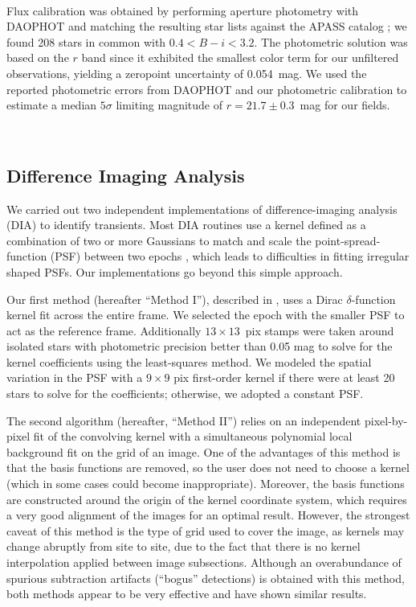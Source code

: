\documentclass[apjl]{emulateapj}
\begin{document}
\ \par

Flux calibration was obtained by performing aperture photometry with DAOPHOT \citep{Stetson1987} and matching the resulting star lists against the APASS catalog \citep{Henden2016}; we found 208 stars in common with $0.4 < B-i < 3.2$. The photometric solution was based on the $r$ band since it exhibited the smallest color term for our unfiltered observations, yielding a zeropoint uncertainty of 0.054~mag. We used the reported photometric errors from DAOPHOT and our photometric calibration to estimate a median $5\sigma$ limiting magnitude of $r=21.7\pm0.3$~mag for our fields.

\ \par

\subsection{Difference Imaging  Analysis} \label{2kk}
We carried out two independent implementations of difference-imaging analysis (DIA) to identify transients. Most DIA routines use a kernel defined as a combination of two or more Gaussians to match and scale the point-spread-function (PSF) between two epochs \citep{Alard1998}, which leads to difficulties in fitting irregular shaped PSFs. Our implementations go beyond this simple approach.

Our first method (hereafter ``Method I''), described in \citet{Oelkers2015}, uses a Dirac $\delta$-function kernel fit across the entire frame. We selected the epoch with the smaller PSF to act as the reference frame. Additionally $13\times13$~pix stamps were taken around isolated stars with photometric precision better than 0.05 mag to solve for the kernel coefficients using the least-squares method. We modeled the spatial variation in the PSF with a $9\times9$ pix first-order kernel \citep{Alard2000,Miller2008} if there were at least 20 stars to solve for the coefficients; otherwise, we adopted a constant PSF.

The second algorithm (hereafter, ``Method II'') relies on an independent pixel-by-pixel fit of the convolving kernel \citep{Bramich2008} with a simultaneous polynomial local background fit on the grid of an image. One of the advantages of this method is that the basis functions are removed, so the user does not need to choose a kernel (which in some cases could become inappropriate). Moreover, the basis functions are constructed around the origin of the kernel coordinate system, which requires a very good  alignment of the images for an optimal result. However, the strongest caveat of this method is the type of  grid used to cover the image, as kernels may change abruptly from site to site, due to the fact that there is no kernel interpolation applied between image subsections. Although an overabundance of spurious subtraction artifacts (``bogus'' detections) is obtained with this method, both methods appear to be very effective and have shown similar results.
\end{document}
